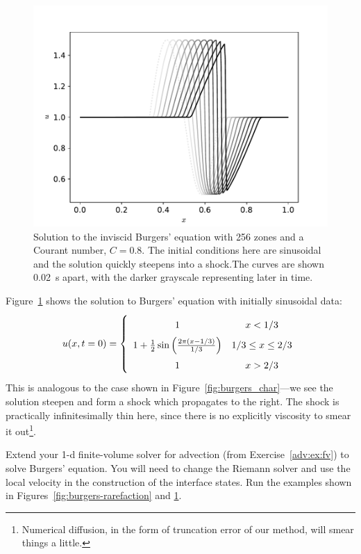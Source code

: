 \begin{figure}[t]
\centering
\includegraphics[width=0.8\linewidth]{fv-burger-sine}
\caption[Shock solutions to the inviscid Burgers'
  equation]{\label{fig:burgers-shock} Solution to the inviscid
  Burgers' equation with 256 zones and a Courant number, $C = 0.8$.
  The initial conditions here are sinusoidal and the solution quickly
  steepens into a shock.The curves are shown 0.02~s apart, with the
  darker grayscale representing later in
  time. \\ }
\end{figure}

Figure~\ref{fig:burgers-shock} shows the solution to Burgers'
equation with initially sinusoidal data:
\begin{equation}
\label{eq:burgers:shockic}
\renewcommand{\arraystretch}{1.75}
u(x, t=0) = \left \{ \begin{array}{cc}
    1   & x < 1/3 \\
    1 + \frac{1}{2} \sin\left (\frac{2\pi (x - 1/3)}{1/3}\right ) & 1/3 \le x \le 2/3 \\
    1   & x > 2/3
\end{array}
\right .
\renewcommand{\arraystretch}{1.0}
\end{equation}
This is analogous to the case shown in
Figure~\ref{fig:burgers_char}---we see the solution steepen and form a
shock which propagates to the right.  The shock is practically infinitesimally thin
here, since there is no explicitly viscosity to smear it out\footnote{Numerical diffusion,
in the form of truncation error of our method, will smear things a little.}.

\begin{exercise}
{Extend your 1-d finite-volume solver for advection (from
  Exercise~\ref{adv:ex:fv}) to solve Burgers' equation.  You will
  need to change the Riemann solver and use the local velocity in the
  construction of the interface states.  Run the examples shown in
  Figures~\ref{fig:burgers-rarefaction} and \ref{fig:burgers-shock}}.
\end{exercise}

